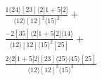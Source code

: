\documentclass[varwidth, border=5pt]{standalone}
\begin{document}
\begin{my}
$\begin{gathered}
\scriptscriptstyle\frac{1⟨24⟩[23]⟨2|1+5|2]}{⟨12⟩[12]^2⟨15⟩^2}+\\
\scriptscriptstyle\frac{-2[35]⟨2|1+5|2]⟨14⟩}{⟨12⟩[12]⟨15⟩^2[25]}+\\
\scriptscriptstyle\frac{2⟨2|1+5|2][23]⟨25⟩⟨45⟩[25]}{⟨12⟩[12]^3⟨15⟩^3}\phantom{+}
\end{gathered}$
\end{my}
\end{document}
